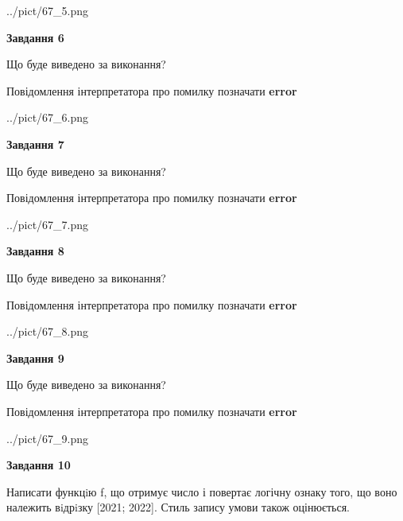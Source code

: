 \documentclass[12pt, ukrainian]{article}
\begin{document}
{\begin {large}
\begin{center}
	{../pict/67_5.png}
\end{center}
\newpage

{\begin {center}\textbf{Завдання 6}\end {center}}\par
Що буде виведено за виконання? \par
Повідомлення інтерпретатора про помилку позначати \textbf{error}

\begin{center}
	{../pict/67_6.png}
\end{center}
\newpage

{\begin {center}\textbf{Завдання 7}\end {center}}\par
Що буде виведено за виконання? \par
Повідомлення інтерпретатора про помилку позначати \textbf{error}

\begin{center}
	{../pict/67_7.png}
\end{center}
\newpage

{\begin {center}\textbf{Завдання 8}\end {center}}\par
Що буде виведено за виконання? \par
Повідомлення інтерпретатора про помилку позначати \textbf{error}

\begin{center}
	{../pict/67_8.png}
\end{center}
\newpage

{\begin {center}\textbf{Завдання 9}\end {center}}\par
Що буде виведено за виконання? \par
Повідомлення інтерпретатора про помилку позначати \textbf{error}

\begin{center}
	{../pict/67_9.png}
\end{center}
\newpage

{\begin {center}\textbf{Завдання 10}\end {center}}\par

Написати функцiю f, що отримує число і повертає логічну ознаку того, що воно належить вiдрiзку [2021; 2022]. Стиль запису умови також оцінюється.\par
\newpage

\end {large}}
\end{document}
